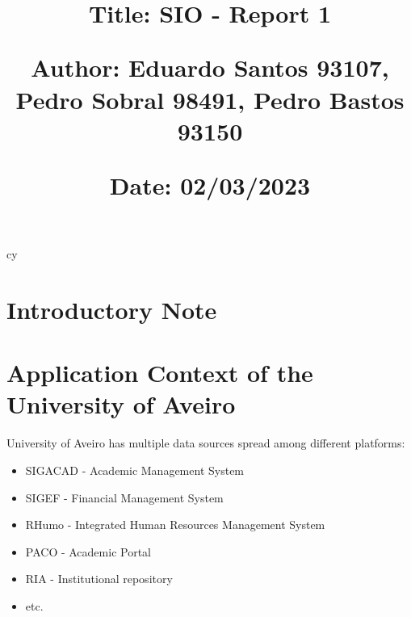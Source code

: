 cy\documentclass{article}
\begin{document}
\title{\vspace{-0.9cm}
       \vspace{1cm}
       \normalsize
       \raggedright\textbf{Title: \hspace{1.5cm} SIO - Report 1} \\ \vspace{0.4cm}
       \raggedright\textbf{Author: \hspace{1.12cm} Eduardo Santos 93107, Pedro Sobral 98491, Pedro Bastos 93150} \\ \vspace{0.4cm}
       \raggedright\textbf{Date: \hspace{1.48cm} 02/03/2023} \\}
\author{}
\date{}

\maketitle
\thispagestyle{fancy}


\vspace{-1.4cm}

\tableofcontents


\fontsize{10pt}{13pt}
\selectfont
\lsstyle



\section{Introductory Note}

\section{Application Context of the University of Aveiro}

University of Aveiro has multiple data sources spread among different platforms:

\begin{itemize}
    \item SIGACAD - Academic Management System
    \item SIGEF - Financial Management System
    \item RHumo - Integrated Human Resources Management System
    \item PACO - Academic Portal
    \item RIA - Institutional repository
    \item etc.
\end{itemize}
\end{document}
